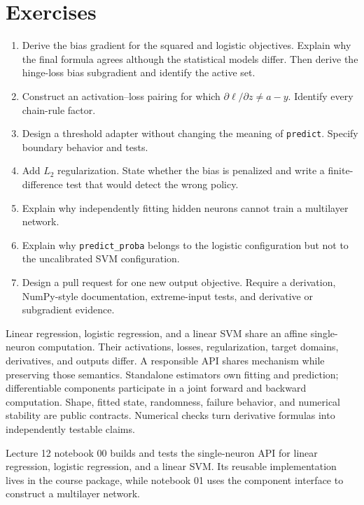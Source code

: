 \section{Exercises}
\begin{enumerate}
  \item Derive the bias gradient for the squared and logistic objectives.
  Explain why the final formula agrees although the statistical models differ.
  Then derive the hinge-loss bias subgradient and identify the active set.
  \item Construct an activation--loss pairing for which
  $\partial\ell/\partial z\ne a-y$. Identify every chain-rule factor.
  \item Design a threshold adapter without changing the meaning of
  \texttt{predict}. Specify boundary behavior and tests.
  \item Add $L_2$ regularization. State whether the bias is penalized and write
  a finite-difference test that would detect the wrong policy.
  \item Explain why independently fitting hidden neurons cannot train a
  multilayer network.
  \item Explain why \texttt{predict\_proba} belongs to the logistic
  configuration but not to the uncalibrated SVM configuration.
  \item Design a pull request for one new output objective. Require a
  derivation, NumPy-style documentation, extreme-input tests, and derivative or
  subgradient evidence.
\end{enumerate}

\begin{chapterreview}
Linear regression, logistic regression, and a linear SVM share an affine
single-neuron computation. Their activations, losses, regularization, target
domains, derivatives, and outputs differ. A responsible API shares mechanism
while preserving those semantics. Standalone estimators own fitting and
prediction; differentiable components participate in a joint forward and
backward computation. Shape, fitted state, randomness, failure behavior, and
numerical stability are public contracts. Numerical checks turn derivative
formulas into independently testable claims.
\end{chapterreview}

\begin{notebooklink}
Lecture 12 notebook 00 builds and tests the single-neuron API for linear
regression, logistic regression, and a linear SVM. Its reusable implementation
lives in the course package, while notebook 01 uses the component interface to
construct a multilayer network.
\end{notebooklink}
